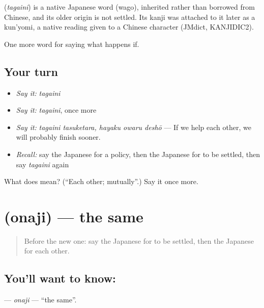 \begin{cousinweb}
\textbf{} (\emph{tagaini}) is a native Japanese word (wago), inherited rather than borrowed from Chinese, and its older origin is not settled. Its kanji was attached to it later as a kun'yomi, a native reading given to a Chinese character (JMdict, KANJIDIC2).
\end{cousinweb}

\begin{grammarlens}[title={What you've built}]
One more word for saying what happens if.
\end{grammarlens}

\subsection*{Your turn}
\begin{itemize}
\raggedright
  \item \emph{Say it:} \emph{tagaini}
  \item \emph{Say it:} \emph{tagaini}, once more
  \item \emph{Say it:} \emph{tagaini tasuketara, hayaku owaru deshō} — If we help each other, we will probably finish sooner.
  \item \emph{Recall:} say the Japanese for a policy, then the Japanese for to be settled, then say \emph{tagaini} again
\end{itemize}

\begin{tcolorbox}[breakable,colback=teal!4,colframe=teal!35!black,title={Before you move on}]
What does  mean? (\textquotedblleft{}Each other; mutually\textquotedblright{}.) Say it once more.
\end{tcolorbox}
\section[\texorpdfstring{\ja{おなじ} (onaji)}{おなじ (onaji)}]{ (onaji) — the same}

\label{lesson:JA-C370-onaji}



\begin{quote}
Before the new one: say the Japanese for to be settled, then the Japanese for each other.
\end{quote}

\subsection*{You'll want to know: }
\textbf{} — \emph{onaji} — \textquotedblleft{}the same\textquotedblright{}.

